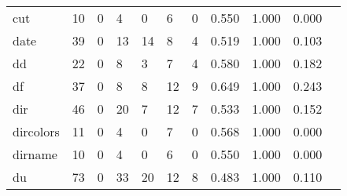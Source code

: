 \begin{longtable}{lp{1.10cm}p{1.10cm}p{1.10cm}p{1.10cm}p{1.10cm}p{1.10cm}p{1.10cm}p{1.10cm}p{1.10cm}p{1.10cm}}
cut       &                     10 &                                  0 &                                 4 &                                0 &                                 6 &                               0 &                          0.550 &                                 1.000 &                               0.000 \\
date      &                     39 &                                  0 &                                13 &                               14 &                                 8 &                               4 &                          0.519 &                                 1.000 &                               0.103 \\
dd        &                     22 &                                  0 &                                 8 &                                3 &                                 7 &                               4 &                          0.580 &                                 1.000 &                               0.182 \\
df        &                     37 &                                  0 &                                 8 &                                8 &                                12 &                               9 &                          0.649 &                                 1.000 &                               0.243 \\
dir       &                     46 &                                  0 &                                20 &                                7 &                                12 &                               7 &                          0.533 &                                 1.000 &                               0.152 \\
dircolors &                     11 &                                  0 &                                 4 &                                0 &                                 7 &                               0 &                          0.568 &                                 1.000 &                               0.000 \\
dirname   &                     10 &                                  0 &                                 4 &                                0 &                                 6 &                               0 &                          0.550 &                                 1.000 &                               0.000 \\
du        &                     73 &                                  0 &                                33 &                               20 &                                12 &                               8 &                          0.483 &                                 1.000 &                               0.110 \\

\end{longtable}
